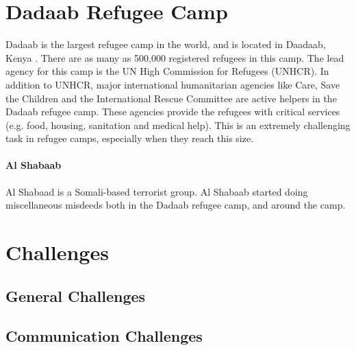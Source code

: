 \section{Dadaab Refugee Camp}
Dadaab is the largest refugee camp in the world, and is located in Daadaab, Kenya \cite{dadaab}. There are as many as 500,000 registered refugees in this camp. The lead agency for this camp is the UN High Commission for Refugees (UNHCR). In addition to UNHCR, major international humanitarian agencies like Care, Save the Children and the International Rescue Committee  are active helpers in the Dadaab refugee camp. These agencies provide the refugees with critical services (e.g. food, housing, sanitation and medical help). This is an extremely challenging task in refugee camps, especially when they reach this size. 

\paragraph{Al Shabaab}
Al Shabaad is a Somali-based terrorist group. Al Shabaab started doing miscellaneous misdeeds both in the Dadaab refugee camp, and around the camp.  


\section{Challenges}

\subsection{General Challenges}

\subsection{Communication Challenges}

